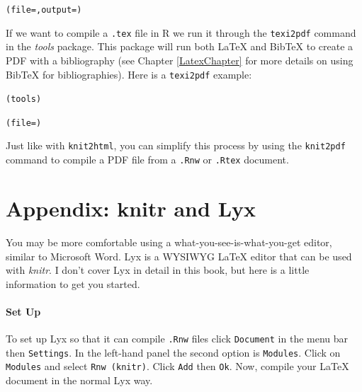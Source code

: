 \documentclass[krantz1]{krantz}
\begin{document}
\begin{knitrout}
\color{fgcolor}\begin{kframe}
\begin{alltt}
(file = , output = )
\end{alltt}
\end{kframe}
\end{knitrout}


\noindent If we want to compile a {\tt{.tex}} file in R we run it through the {\tt{texi2pdf}} command in the {\emph{tools}} package. This package will run both LaTeX and BibTeX to create a PDF with a bibliography (see Chapter \ref{LatexChapter} for more details on using BibTeX for bibliographies). Here is a {\tt{texi2pdf}} example:

\begin{knitrout}
\color{fgcolor}\begin{kframe}
\begin{alltt}
(tools)

(file = )
\end{alltt}
\end{kframe}
\end{knitrout}


\noindent Just like with \texttt{knit2html}, you can simplify this process by using the \texttt{knit2pdf} command to compile a PDF file from a \texttt{.Rnw} or \texttt{.Rtex} document.

\section*{Appendix: knitr and Lyx}

You may be more comfortable using a what-you-see-is-what-you-get editor, similar to Microsoft Word. Lyx is a WYSIWYG LaTeX editor that can be used with \emph{knitr}. I don't cover Lyx in detail in this book, but here is a little information to get you started. 

\paragraph{Set Up}

To set up Lyx so that it can compile \texttt{.Rnw} files click \texttt{Document} in the menu bar then \texttt{Settings}. In the left-hand panel the second option is \texttt{Modules}. Click on \texttt{Modules} and select \texttt{Rnw (knitr)}. Click \texttt{Add} then \texttt{Ok}. Now, compile your LaTeX document in the normal Lyx way.
\end{document}
